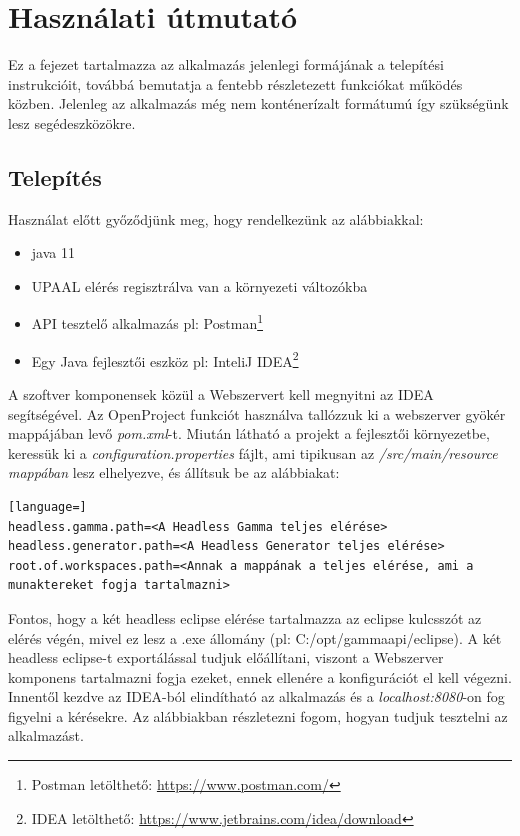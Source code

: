 
\chapter{Használati útmutató}

Ez a fejezet tartalmazza az alkalmazás jelenlegi formájának a telepítési instrukcióit, továbbá bemutatja a fentebb részletezett funkciókat működés közben. Jelenleg az alkalmazás még nem konténerízalt formátumú így szükségünk lesz segédeszközökre. 
\section{Telepítés}

Használat előtt győződjünk meg, hogy rendelkezünk az alábbiakkal:
\begin{itemize}
	\item java 11
	\item UPAAL elérés regisztrálva van a környezeti változókba
	\item API tesztelő alkalmazás pl: Postman\footnote{Postman letölthető: \url{https://www.postman.com/}}
	\item Egy Java fejlesztői eszköz pl: InteliJ IDEA\footnote{IDEA letölthető: \url{https://www.jetbrains.com/idea/download}}
\end{itemize}

A szoftver komponensek közül a Webszervert kell megnyitni az IDEA segítségével. Az OpenProject funkciót használva tallózzuk ki a webszerver gyökér mappájában levő \textit{pom.xml}-t.  Miután látható a projekt a fejlesztői környezetbe, keressük ki a \textit{configuration.properties} fájlt, ami tipikusan az \textit{/src/main/resource mappában} lesz elhelyezve, és állítsuk be az alábbiakat:

\begin{lstlisting}[language=]
headless.gamma.path=<A Headless Gamma teljes elérése>
headless.generator.path=<A Headless Generator teljes elérése>
root.of.workspaces.path=<Annak a mappának a teljes elérése, ami a munaktereket fogja tartalmazni>
\end{lstlisting}

Fontos, hogy a két headless eclipse elérése tartalmazza az eclipse kulcsszót az elérés végén, mivel ez lesz a .exe állomány (pl: C:/opt/gammaapi/eclipse). A két headless eclipse-t exportálással tudjuk előállítani, viszont a Webszerver komponens tartalmazni fogja ezeket, ennek ellenére a konfigurációt el kell végezni.
Innentől kezdve az IDEA-ból elindítható az alkalmazás és a \textit{localhost:8080}-on fog figyelni a kérésekre. Az alábbiakban részletezni fogom, hogyan tudjuk tesztelni az alkalmazást.

